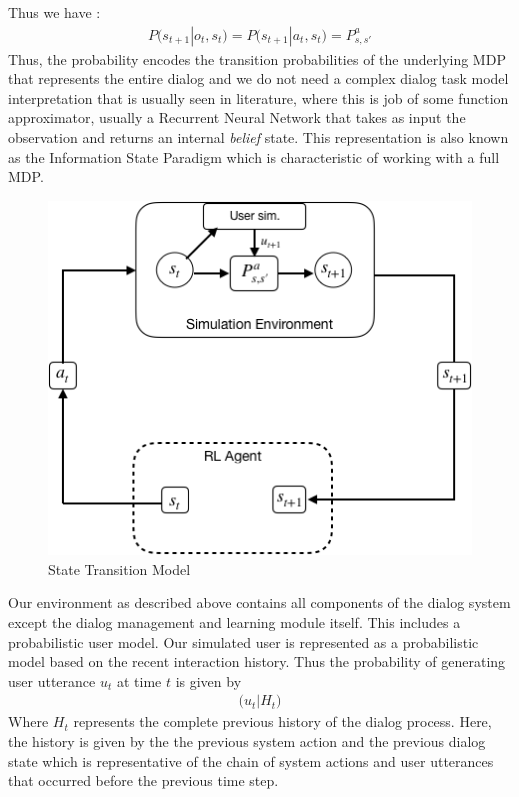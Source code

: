 \documentclass[12pt]{extarticle}
\numberwithin{equation}{section}
\begin{document}
	Thus we have :
	\begin{align}\label{eq:trans-prob2}
	P\big(s_{t+1}|o_t, s_t\big)
	= P\big(s_{t+1} | a_t,s_t\big) = P_{s,s'}^a
	\end{align}
	Thus, the probability encodes the transition probabilities of the underlying MDP that represents the entire dialog and we do not need a complex dialog task model interpretation that is usually seen in literature, where this is job of some function approximator, usually a Recurrent Neural Network that takes as input the observation and returns an internal \textit{belief} state. This representation is also known as the Information State Paradigm \cite{Larsson:2000:ISD:973935.973943} which is characteristic of working with a full MDP.
	\begin{figure}[h]
		\centering
		\includegraphics[scale=0.7]{state-trans}
		\caption{State Transition Model
			\label{state-trans}}
	\end{figure}
	Our environment as described above contains all components of the dialog system except the dialog management and learning module itself. This includes a probabilistic user model. Our simulated user is represented as a probabilistic model based on the recent interaction history. Thus the probability of generating user utterance $u_t$ at time $t$ is given by 
	\begin{align}
	\big(u_t | H_t\big)
	\end{align}
	Where $H_t$ represents the complete previous history of the dialog process. Here, the history is given by the the previous system action and the previous dialog state which is representative of the chain of system actions and user utterances that occurred before the previous time step. 
\end{document}
